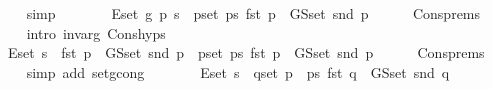 \begin{isabellebody}
\ \ \ \ \isamarkupfalse%
\ simp\isanewline
\ \ \isamarkupfalse%
\ \isamarkupfalse%
\ {\isachardoublequoteopen}{\isachardot}{\kern0pt}{\isachardot}{\kern0pt}{\isachardot}{\kern0pt}\ {\isacharequal}{\kern0pt}\ E{\isachardot}{\kern0pt}set\ {\isacharparenleft}{\kern0pt}g\ p\ s{\isacharparenright}{\kern0pt}\ {\isasymunion}\ {\isacharparenleft}{\kern0pt}{\isasymUnion}p{\isasymin}set\ ps{\isachardot}{\kern0pt}\ {\isacharbraceleft}{\kern0pt}fst\ p{\isacharbraceright}{\kern0pt}\ {\isasymtimes}\ G{\isachardot}{\kern0pt}S{\isachardot}{\kern0pt}set\ {\isacharparenleft}{\kern0pt}snd\ p{\isacharparenright}{\kern0pt}{\isacharparenright}{\kern0pt}{\isachardoublequoteclose}\isanewline
\ \ \ \ \isamarkupfalse%
\ Cons{\isachardot}{\kern0pt}prems\isanewline
\ \ \ \ \isamarkupfalse%
\ {\isacharparenleft}{\kern0pt}intro\ invar{\isacharunderscore}{\kern0pt}g\ Cons{\isachardot}{\kern0pt}hyps{\isacharparenright}{\kern0pt}\isanewline
\ \ \isamarkupfalse%
\ \isamarkupfalse%
\ {\isachardoublequoteopen}{\isachardot}{\kern0pt}{\isachardot}{\kern0pt}{\isachardot}{\kern0pt}\ {\isacharequal}{\kern0pt}\ E{\isachardot}{\kern0pt}set\ s\ {\isasymunion}\ {\isacharbraceleft}{\kern0pt}fst\ p{\isacharbraceright}{\kern0pt}\ {\isasymtimes}\ G{\isachardot}{\kern0pt}S{\isachardot}{\kern0pt}set\ {\isacharparenleft}{\kern0pt}snd\ p{\isacharparenright}{\kern0pt}\ {\isasymunion}\ {\isacharparenleft}{\kern0pt}{\isasymUnion}p{\isasymin}set\ ps{\isachardot}{\kern0pt}\ {\isacharbraceleft}{\kern0pt}fst\ p{\isacharbraceright}{\kern0pt}\ {\isasymtimes}\ G{\isachardot}{\kern0pt}S{\isachardot}{\kern0pt}set\ {\isacharparenleft}{\kern0pt}snd\ p{\isacharparenright}{\kern0pt}{\isacharparenright}{\kern0pt}{\isachardoublequoteclose}\isanewline
\ \ \ \ \isamarkupfalse%
\ Cons{\isachardot}{\kern0pt}prems\isanewline
\ \ \ \ \isamarkupfalse%
\ {\isacharparenleft}{\kern0pt}simp\ add{\isacharcolon}{\kern0pt}\ set{\isacharunderscore}{\kern0pt}g{\isacharunderscore}{\kern0pt}cong{\isacharparenright}{\kern0pt}\isanewline
\ \ \isamarkupfalse%
\ \isamarkupfalse%
\ {\isachardoublequoteopen}{\isachardot}{\kern0pt}{\isachardot}{\kern0pt}{\isachardot}{\kern0pt}\ {\isacharequal}{\kern0pt}\ E{\isachardot}{\kern0pt}set\ s\ {\isasymunion}\ {\isacharparenleft}{\kern0pt}{\isasymUnion}q{\isasymin}set\ {\isacharparenleft}{\kern0pt}p\ {\isacharhash}{\kern0pt}\ ps{\isacharparenright}{\kern0pt}{\isachardot}{\kern0pt}\ {\isacharbraceleft}{\kern0pt}fst\ q{\isacharbraceright}{\kern0pt}\ {\isasymtimes}\ G{\isachardot}{\kern0pt}S{\isachardot}{\kern0pt}set\ {\isacharparenleft}{\kern0pt}snd\ q{\isacharparenright}{\kern0pt}{\isacharparenright}{\kern0pt}{\isachardoublequoteclose}\isanewline

\end{isabellebody}
